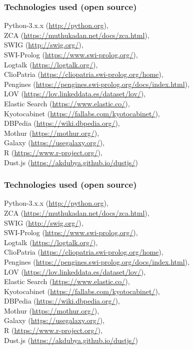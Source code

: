 \documentclass[10pt]{beamer}
\begin{document}
\begin{frame}
  \frametitle{Technologies used (open source)}
  Python-3.x.x (\url{http://python.org}),\\
  ZCA (\url{https://muthukadan.net/docs/zca.html}),\\
  SWIG (\url{http://swig.org/}),\\
  SWI-Prolog (\url{https://www.swi-prolog.org/}),\\
  Logtalk (\url{https://logtalk.org/}),\\
  ClioPatria (\url{https://cliopatria.swi-prolog.org/home}),\\
  Pengines (\url{https://pengines.swi-prolog.org/docs/index.html}),\\
  LOV (\url{https://lov.linkeddata.es/dataset/lov/}),\\
  Elastic Search (\url{https://www.elastic.co/}),\\
  Kyotocabinet (\url{https://fallabs.com/kyotocabinet/}),\\
  DBPedia (\url{https://wiki.dbpedia.org/}),\\
  Mothur (\url{https://mothur.org/}),\\
  Galaxy (\url{https://usegalaxy.org/}),\\
  R (\url{https://www.r-project.org/}), \\
  Dust.js (\url{https://akdubya.github.io/dustjs/})
\end{frame}\begin{frame}
  \frametitle{Technologies used (open source)}
  Python-3.x.x (\url{http://python.org}),\\
  ZCA (\url{https://muthukadan.net/docs/zca.html}),\\
  SWIG (\url{http://swig.org/}),\\
  SWI-Prolog (\url{https://www.swi-prolog.org/}),\\
  Logtalk (\url{https://logtalk.org/}),\\
  ClioPatria (\url{https://cliopatria.swi-prolog.org/home}),\\
  Pengines (\url{https://pengines.swi-prolog.org/docs/index.html}),\\
  LOV (\url{https://lov.linkeddata.es/dataset/lov/}),\\
  Elastic Search (\url{https://www.elastic.co/}),\\
  Kyotocabinet (\url{https://fallabs.com/kyotocabinet/}),\\
  DBPedia (\url{https://wiki.dbpedia.org/}),\\
  Mothur (\url{https://mothur.org/}),\\
  Galaxy (\url{https://usegalaxy.org/}),\\
  R (\url{https://www.r-project.org/}), \\
  Dust.js (\url{https://akdubya.github.io/dustjs/})
\end{frame}
\end{document}
